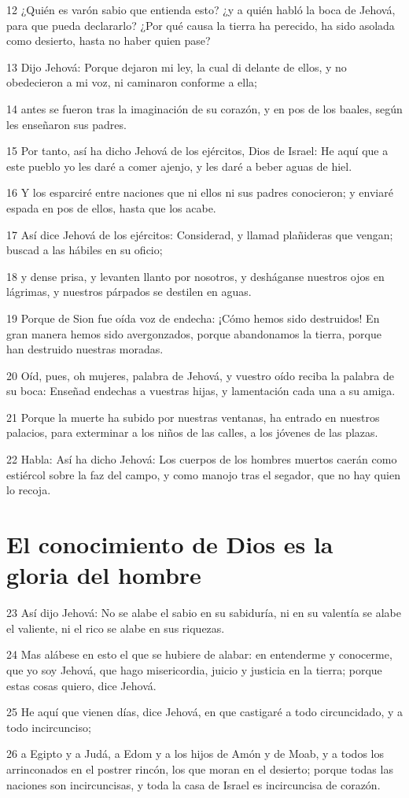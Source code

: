 \par 12 ¿Quién es varón sabio que entienda esto? ¿y a quién habló la boca de Jehová, para que pueda declararlo? ¿Por qué causa la tierra ha perecido, ha sido asolada como desierto, hasta no haber quien pase?
\par 13 Dijo Jehová: Porque dejaron mi ley, la cual di delante de ellos, y no obedecieron a mi voz, ni caminaron conforme a ella;
\par 14 antes se fueron tras la imaginación de su corazón, y en pos de los baales, según les enseñaron sus padres.
\par 15 Por tanto, así ha dicho Jehová de los ejércitos, Dios de Israel: He aquí que a este pueblo yo les daré a comer ajenjo, y les daré a beber aguas de hiel.
\par 16 Y los esparciré entre naciones que ni ellos ni sus padres conocieron; y enviaré espada en pos de ellos, hasta que los acabe.
\par 17 Así dice Jehová de los ejércitos: Considerad, y llamad plañideras que vengan; buscad a las hábiles en su oficio;
\par 18 y dense prisa, y levanten llanto por nosotros, y desháganse nuestros ojos en lágrimas, y nuestros párpados se destilen en aguas.
\par 19 Porque de Sion fue oída voz de endecha: ¡Cómo hemos sido destruidos! En gran manera hemos sido avergonzados, porque abandonamos la tierra, porque han destruido nuestras moradas.
\par 20 Oíd, pues, oh mujeres, palabra de Jehová, y vuestro oído reciba la palabra de su boca: Enseñad endechas a vuestras hijas, y lamentación cada una a su amiga.
\par 21 Porque la muerte ha subido por nuestras ventanas, ha entrado en nuestros palacios, para exterminar a los niños de las calles, a los jóvenes de las plazas.
\par 22 Habla: Así ha dicho Jehová: Los cuerpos de los hombres muertos caerán como estiércol sobre la faz del campo, y como manojo tras el segador, que no hay quien lo recoja.

\section*{El conocimiento de Dios es la gloria del hombre}

\par 23 Así dijo Jehová: No se alabe el sabio en su sabiduría, ni en su valentía se alabe el valiente, ni el rico se alabe en sus riquezas.
\par 24 Mas alábese en esto el que se hubiere de alabar: en entenderme y conocerme, que yo soy Jehová, que hago misericordia, juicio y justicia en la tierra; porque estas cosas quiero, dice Jehová.
\par 25 He aquí que vienen días, dice Jehová, en que castigaré a todo circuncidado, y a todo incircunciso;
\par 26 a Egipto y a Judá, a Edom y a los hijos de Amón y de Moab, y a todos los arrinconados en el postrer rincón, los que moran en el desierto; porque todas las naciones son incircuncisas, y toda la casa de Israel es incircuncisa de corazón.

